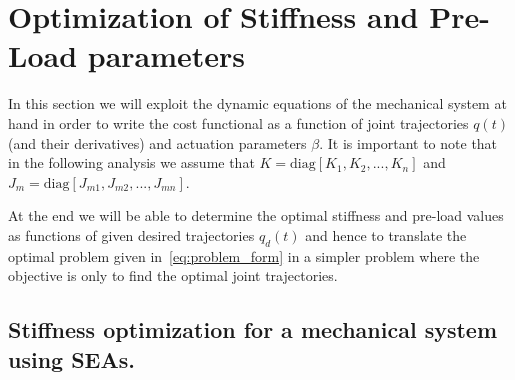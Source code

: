 \section{Optimization of Stiffness and Pre-Load parameters}
\label{sec:optimization}

In this section we will exploit the dynamic equations of the mechanical system at hand in order to write the cost functional as a function of joint trajectories $q(t)$ (and their derivatives) and actuation parameters $\beta$. It is important to note that in the following analysis we assume that $K = \text{diag}[K_{1}, K_{2}, ..., K_{n}]$ and $J_{m} = \text{diag}[J_{m1}, J_{m2}, ..., J_{mn}]$. 

At the end we will be able to determine the optimal stiffness and pre-load values as functions of given desired trajectories $q_d(t)$ and hence to translate the optimal problem given in~\eqref{eq:problem_form} 
in a simpler problem where the objective is only to find the optimal joint trajectories.


\subsection{Stiffness optimization for a mechanical system using SEAs.}
\label{sec:SEAOptimization}

